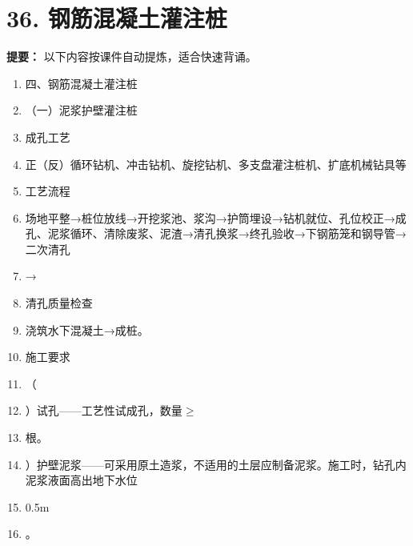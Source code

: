 \documentclass[UTF8,fontset=fandol,11pt]{ctexart}
\begin{document}
\newpage

\section*{36. 钢筋混凝土灌注桩}


\begin{mainbox}

\textbf{提要：} 以下内容按课件自动提炼，适合快速背诵。

\end{mainbox}

\begin{enumerate}[label=\arabic*.]

\item 四、钢筋混凝土灌注桩

\item （一）泥浆护壁灌注桩

\item 成孔工艺

\item 正（反）循环钻机、冲击钻机、旋挖钻机、多支盘灌注桩机、扩底机械钻具等

\item 工艺流程

\item 场地平整→桩位放线→开挖浆池、浆沟→护筒埋设→钻机就位、孔位校正→成孔、泥浆循环、清除废浆、泥渣→清孔换浆→终孔验收→下钢筋笼和钢导管→二次清孔

\item →

\item 清孔质量检查

\item 浇筑水下混凝土→成桩。

\item 施工要求

\item （

\item ）试孔——工艺性试成孔，数量$\geq$

\item 根。

\item ）护壁泥浆——可采用原土造浆，不适用的土层应制备泥浆。施工时，钻孔内泥浆液面高出地下水位

\item 0.5m

\item 。


\end{enumerate}
\end{document}
